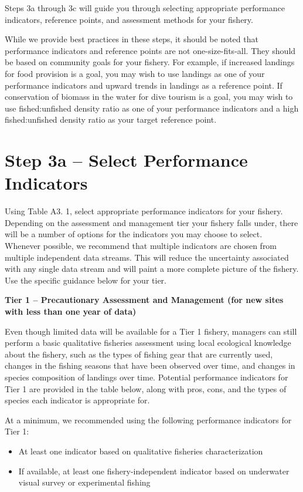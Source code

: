 \documentclass[]{book}
\begin{document}
Steps 3a through 3c will guide you through selecting appropriate
performance indicators, reference points, and assessment methods for
your fishery.

While we provide best practices in these steps, it should be noted that
performance indicators and reference points are not one-size-fits-all.
They should be based on community goals for your fishery. For example,
if increased landings for food provision is a goal, you may wish to use
landings as one of your performance indicators and upward trends in
landings as a reference point. If conservation of biomass in the water
for dive tourism is a goal, you may wish to use fished:unfished density
ratio as one of your performance indicators and a high fished:unfished
density ratio as your target reference point.

\section{Step 3a -- Select Performance
Indicators}\label{step-3a-select-performance-indicators}

Using Table A3. 1, select appropriate performance indicators for your
fishery. Depending on the assessment and management tier your fishery
falls under, there will be a number of options for the indicators you
may choose to select. Whenever possible, we recommend that multiple
indicators are chosen from multiple independent data streams. This will
reduce the uncertainty associated with any single data stream and will
paint a more complete picture of the fishery. Use the specific guidance
below for your tier.

\textbf{Tier 1 -- Precautionary Assessment and Management (for new sites
with less than one year of data)}

Even though limited data will be available for a Tier 1 fishery,
managers can still perform a basic qualitative fisheries assessment
using local ecological knowledge about the fishery, such as the types of
fishing gear that are currently used, changes in the fishing seasons
that have been observed over time, and changes in species composition of
landings over time. Potential performance indicators for Tier 1 are
provided in the table below, along with pros, cons, and the types of
species each indicator is appropriate for.

At a minimum, we recommended using the following performance indicators
for Tier 1:

\begin{itemize}
\item
  At least one indicator based on qualitative fisheries characterization
\item
  If available, at least one fishery-independent indicator based on
  underwater visual survey or experimental fishing
\end{itemize}
\end{document}
